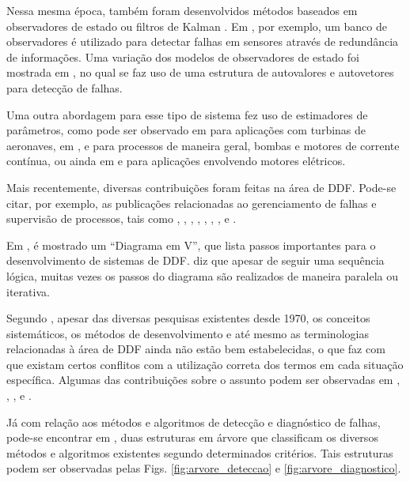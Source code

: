 
Nessa mesma época, também foram desenvolvidos métodos baseados em observadores
de estado ou filtros de Kalman \cite{beard:1971,mehra:1971,jones:1973}. Em
, por exemplo, um banco de observadores é utilizado para
detectar falhas em sensores através de redundância de informações. Uma variação
dos modelos de observadores de estado foi mostrada em ,
no qual se faz uso de uma estrutura de autovalores e autovetores para detecção
de falhas.

Uma outra abordagem para esse tipo de sistema fez uso de estimadores de
parâmetros, como pode ser observado em  para
aplicações com turbinas de aeronaves, em ,
 e  para processos de
maneira geral, bombas e motores de corrente contínua, ou ainda em
 e  para aplicações envolvendo
motores elétricos.

Mais recentemente, diversas contribuições foram feitas na área de DDF. Pode-se
citar, por exemplo, as publicações relacionadas ao gerenciamento de falhas e
supervisão de processos, tais como ,
, , ,
, , ,
 e .

Em , é mostrado um ``Diagrama em V'', que lista passos
importantes para o desenvolvimento de sistemas de DDF.
 diz que apesar de seguir uma sequência lógica, muitas
vezes os passos do diagrama são realizados de maneira paralela ou iterativa.

Segundo , apesar das diversas pesquisas existentes desde
1970, os conceitos sistemáticos, os métodos de desenvolvimento e até mesmo as
terminologias relacionadas à área de DDF ainda não estão bem estabelecidas, o
que faz com que existam certos conflitos com a utilização correta dos termos em
cada situação específica. Algumas das contribuições sobre o assunto podem ser
observadas em , ,
,  e .

Já com relação aos métodos e algoritmos de detecção e diagnóstico de falhas,
pode-se encontrar em , duas estruturas em árvore que
classificam os diversos métodos e al\-go\-rit\-mos existentes segundo
determinados critérios. Tais estruturas podem ser observadas pelas Figs.
\ref{fig:arvore_deteccao} e \ref{fig:arvore_diagnostico}.

